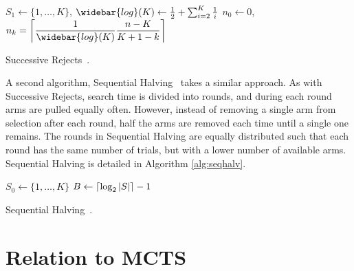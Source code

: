 \documentclass{kecsmstr}
\DeclarePairedDelimiter{\ceil}{\lceil}{\rceil}
\DeclarePairedDelimiter{\floor}{\lfloor}{\rfloor}
\begin{document}
\IncMargin{1em}
\begin{algorithm2e}[ht]
	\Indm
	\vspace{0.2cm}
	\Indp
	$S_1 \gets \{1,\dots,K\}$, 
	$\widebar{log}(K) \gets \frac{1}{2} + \sum_{i=2}^{K} \frac{1}{i}$
	$n_0 \gets 0$, 																\;
																				\;
	 {
		$n_k = \displaystyle\ceil[\bigg]{\frac{1}{\widebar{log}(K)} \frac{n-K}{K+1-k}}$				\;
	}
																				\;
																				\;
  \caption{Successive Rejects~\protect{}. \label{alg:succrej}}
\end{algorithm2e}
\DecMargin{1em}

A second algorithm, Sequential Halving~ takes a similar approach. As with Successive Rejects, search time is divided into rounds, and during each round arms are pulled equally often. However, instead of removing a single arm from selection after each round, half the arms are removed each time until a single one remains. The rounds in Sequential Halving are equally distributed such that each round has the same number of trials, but with a lower number of available arms. Sequential Halving is detailed in Algorithm \ref{alg:seqhalv}.

\IncMargin{1em}
\begin{algorithm2e}[ht]
	\Indm
	\vspace{0.2cm}
	\Indp
	$S_0 \gets \{1,\dots,K\}$																\;
	$B \gets \ceil{\log_2{|S|}} - 1$														\;
  \caption{Sequential Halving~\protect{}. \label{alg:seqhalv}}
\end{algorithm2e}
\DecMargin{1em}

\section{Relation to MCTS}
\end{document}
